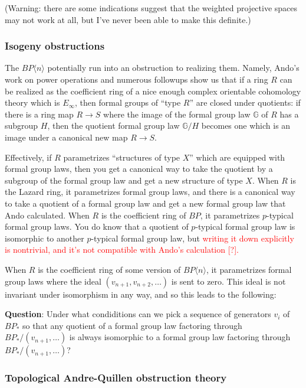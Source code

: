 \documentclass[12pt,titlepage]{article}
\newcommand{\rd}[1]{{\textcolor{red}{#1}}}
\theoremstyle{plain}
\theoremstyle{definition}
\theoremstyle{remark}
\begin{document}
(Warning: there are some indications suggest that the weighted projective spaces may not work at all, but I'{}ve never been able to make this definite.)

\hypertarget{isogeny_obstructions_13}{}\subsubsection{{Isogeny obstructions}}\label{isogeny_obstructions_13}

The $BP\langle n\rangle$ potentially run into an obstruction to realizing them. Namely, Ando'{}s work on power operations and numerous followups show us that if a ring $R$ can be realized as the coefficient ring of a nice enough complex orientable cohomology theory which is $E_\infty$, then formal groups of ``{}type $R$''{} are closed under quotients: if there is a ring map $R \to S$ where the image of the formal group law $\mathbb{G}$ of $R$ has a subgroup $H$, then the quotient formal group law $\mathbb{G}/H$ becomes one which is an image under a canonical new map $R \to S$.

Effectively, if $R$ parametrizes ``{}structures of type $X$''{} which are equipped with formal group laws, then you get a canonical way to take the quotient by a subgroup of the formal group law and get a new structure of type $X$. When $R$ is the Lazard ring, it parametrizes formal group laws, and there is a canonical way to take a quotient of a formal group law and get a new formal group law that Ando calculated. When $R$ is the coefficient ring of $BP$, it parametrizes $p$-typical formal group laws. You do know that a quotient of $p$-typical formal group law is isomorphic to another $p$-typical formal group law, but \rd{writing it down explicitly is nontrivial, and it'{}s not compatible with Ando'{}s calculation [?].}

When $R$ is the coefficient ring of some version of $BP\langle
n\rangle$, it parametrizes formal group laws where the ideal $(v_{n+1}, v_{n+2}, \ldots)$ is sent to zero. This ideal is not invariant under isomorphism in any way, and so this leads to the following:

\textbf{Question}: Under what condiditions can we pick a sequence of generators $v_i$ of $BP_*$ so that any quotient of a formal group law factoring through $BP_*/(v_{n+1},\ldots)$ is always isomorphic to a formal group law factoring through $BP_*/(v_{n+1},\ldots)$?

\hypertarget{topological_andrequillen_obstruction_theory_14}{}\subsubsection{{Topological Andre-Quillen obstruction theory}}\label{topological_andrequillen_obstruction_theory_14}
\end{document}
